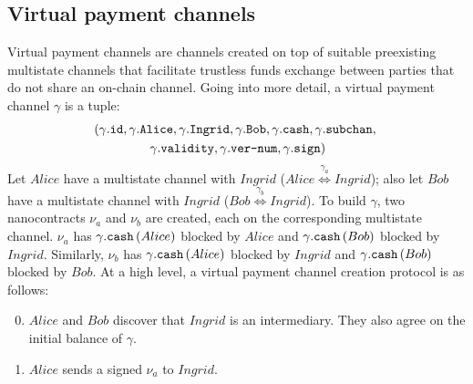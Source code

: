 \subsection{Virtual payment channels}
  Virtual payment channels are channels created on top of suitable preexisting multistate
  channels that facilitate trustless funds exchange between parties that do not share an
  on-chain channel. Going into more detail, a virtual payment channel $\gamma$ is a tuple:
  \begin{gather*}
    \left(\gamma\mbox{.\texttt{id}}, \gamma\mbox{.\texttt{Alice}},
    \gamma\mbox{.\texttt{Ingrid}}, \gamma\mbox{.\texttt{Bob}},
    \gamma\mbox{.\texttt{cash}}, \gamma\mbox{.\texttt{subchan}}, \right. \\
    \left.\gamma\mbox{.\texttt{validity}}, \gamma\mbox{.\texttt{ver-num}},
    \gamma\mbox{.\texttt{sign}}\right)
  \end{gather*}
  Let $Alice$ have a multistate channel with $Ingrid$ ($Alice
  \overset{\gamma_a}{\Leftrightarrow} Ingrid$); also let $Bob$ have a multistate channel
  with $Ingrid$ ($Bob \overset{\gamma_b}{\Leftrightarrow} Ingrid$). To build $\gamma$, two
  nanocontracts $\nu_a$ and $\nu_b$ are created, each on the corresponding multistate
  channel. $\nu_a$ has $\gamma\mbox{.\texttt{cash}}\left(Alice\right)$ blocked by $Alice$
  and $\gamma\mbox{.\texttt{cash}}\left(Bob\right)$ blocked by $Ingrid$. Similarly,
  $\nu_b$ has $\gamma\mbox{.\texttt{cash}}\left(Alice\right)$ blocked by $Ingrid$ and
  $\gamma\mbox{.\texttt{cash}}\left(Bob\right)$ blocked by $Bob$. At a high level, a
  virtual payment channel creation protocol is as follows:
  \begin{enumerate}
  \setcounter{enumi}{-1}
    \item $Alice$ and $Bob$ discover that $Ingrid$ is an intermediary. They also agree on
    the initial balance of $\gamma$.
    \item $Alice$ sends a signed $\nu_a$ to $Ingrid$.
  \end{enumerate}
